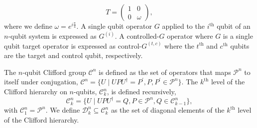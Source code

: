 \documentclass{article}
\theoremstyle{definition}
\theoremstyle{problem}
\theoremstyle{lemma}
\begin{document}
		\begin{equation}
		\label{e4_T}
		T = \begin{pmatrix}
		1 & 0 \\
		0 & \omega
		\end{pmatrix},
		\end{equation}
		where we define $\omega=e^{i\frac{\pi}{4}}$. A single qubit operator $G$ applied to the $i^\text{th}$ qubit of an $n$-qubit system is expressed as $G^{\left(i\right)}$. A controlled-$G$ operator where $G$ is a single qubit target operator is expressed as $\text{control-}G^{\left(t,c\right)}$ where the $t^\text{th}$ and $c^\text{th}$ qubits are the target and control qubit, respectively.
		
		The $n$-qubit Clifford group $\mathcal{C}^n$ is defined as the set of operators that maps $\mathcal{P}^n$ to itself under conjugation, $\mathcal{C}^n = \{U \mid UPU^\dagger = P^\prime, P, P^\prime \in \mathcal{P}^n\}$. The $k^{\text{th}}$ level of the Clifford hierarchy on $n$-qubits, $\mathcal{C}_k^n$, is defined recursively,
		\begin{equation}
		\mathcal{C}_k^n = \{U \mid UPU^\dagger = Q, P \in \mathcal{P}^n, Q \in \mathcal{C}_{k-1}^n\},
		\end{equation}
		with $\mathcal{C}_1^n = \mathcal{P}^n$. We define $\mathcal{D}_k^n \subseteq \mathcal{C}_k^n$ as the set of diagonal elements of the $k^{\text{th}}$ level of the Clifford hierarchy.
		
		
		
	
	\FloatBarrier
\end{document}

